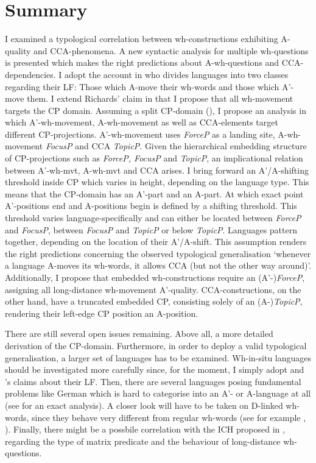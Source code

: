 \documentclass[output=paper,colorlinks,citecolor=brown]{langscibook}
\begin{document}
\section{Summary}
I examined a typological correlation between wh-constructions exhibiting A-quality and CCA-phenomena. A new syntactic analysis for multiple wh-questions is presented which makes the right predictions about A-wh-questions and CCA-dependencies. I adopt the account in \cite{richards1997} who divides languages into two classes regarding their LF: Those which A-move their wh-words and those which A'-move them. I extend Richards' claim in that I propose that all wh-movement targets the CP domain. Assuming a split CP-domain (\citealp{rizzi1997fine}), I propose an analysis in which A'-wh-movement, A-wh-movement as well as CCA-elements target different CP-projections. A'-wh-movement uses \emph{ForceP} as a landing site, A-wh-movement \emph{FocusP} and CCA \emph{TopicP}. Given the hierarchical embedding structure of CP-projections such as \emph{ForceP, FocusP} and \emph{TopicP}, an implicational relation between A'-wh-mvt, A-wh-mvt and CCA arises. I bring forward an A'/A-shifting threshold inside CP which varies in height, depending on the language type. This means that the CP-domain has an A'-part and an A-part. At which exact point A'-positions end and A-positions begin is defined by a shifting threshold. This threshold varies language-specifically and can either be located between \emph{ForceP} and \emph{FocusP}, between \emph{FocusP} and \emph{TopicP} or below \emph{TopicP}. Languages pattern together, depending on the location of their A'/A-shift. This assumption renders the right predictions concerning the observed typological generalisation ‘whenever a language A-moves its wh-words, it allows CCA (but not the other way around)'.  Additionally, I propose that embedded wh-constructions require an (A'-)\emph{ForceP}, assigning all long-distance wh-movement A'-quality. CCA-constructions, on the other hand, have a truncated embedded CP, consisting solely of an (A-)\emph{TopicP}, rendering their left-edge CP position an A-position. 

There are still several open issues remaining. Above all, a more detailed derivation of the CP-domain. Furthermore, in order to deploy a valid typological generalisation, a larger set of languages has to be examined. Wh-in-situ languages should be investigated more carefully since, for the moment, I simply adopt \cite{richards1997} and \cite{huang1982move}'s claims about their LF. Then, there are several languages posing fundamental problems like German which is hard to categorise into an A'- or A-language at all (see \citealp{wiltschko1997d} for an exact analysis). A closer look will have to be taken on D-linked wh-words, since they behave very different from regular wh-words (see for example \citealp{pesetsky1987wh}, \citealp{krapova1999subjunctive}). Finally, there might be a possbile correlation with the ICH proposed in \cite{WurmbrandLohningerToAppear}, regarding the type of matrix predicate and the behaviour of long-distance wh-questions. 
\end{document}
